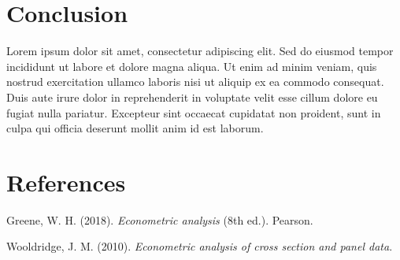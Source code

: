 \documentclass[
  11pt,
  a4paper,
  DIV=11,
  numbers=noendperiod]{scrartcl}
\newlength{\cslhangindent}
\newenvironment{CSLReferences}[2] %
 {\begin{list}{}{%
  \setlength{\itemindent}{0pt}
  \setlength{\leftmargin}{0pt}
  \setlength{\parsep}{0pt}
  \ifodd #1
   \setlength{\leftmargin}{\cslhangindent}
   \setlength{\itemindent}{-1\cslhangindent}
  \fi
  \setlength{\itemsep}{#2\baselineskip}}}
 {\end{list}}
\begin{document}
\section{Conclusion}\label{conclusion}

Lorem ipsum dolor sit amet, consectetur adipiscing elit. Sed do eiusmod
tempor incididunt ut labore et dolore magna aliqua. Ut enim ad minim
veniam, quis nostrud exercitation ullamco laboris nisi ut aliquip ex ea
commodo consequat. Duis aute irure dolor in reprehenderit in voluptate
velit esse cillum dolore eu fugiat nulla pariatur. Excepteur sint
occaecat cupidatat non proident, sunt in culpa qui officia deserunt
mollit anim id est laborum.

\newpage{}

\section{References}\label{references}

\label{refs}
\begin{CSLReferences}{1}{0}
Greene, W. H. (2018). \emph{Econometric analysis} (8th ed.). Pearson.

Wooldridge, J. M. (2010). \emph{Econometric analysis of cross section
and panel data}.

\end{CSLReferences}
\end{document}
